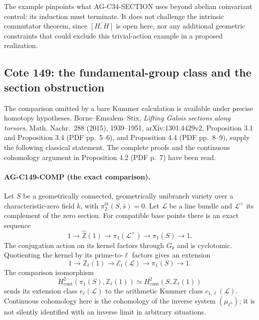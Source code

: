 The example pinpoints what AG-C34-SECTION uses beyond abelian
coinvariant control: its induction must terminate. It does not challenge
the intrinsic commutator theorem, since $\overline{[H,H]}$ is open
here, nor any additional geometric constraints that could exclude this
trivial-action example in a proposed realization.

\subsection{Cote 149: the fundamental-group class and the section obstruction}
\label{ag:c149-comparison}

The comparison omitted by a bare Kummer calculation is available under
precise homotopy hypotheses. Borne--Emsalem--Stix,
\emph{Lifting Galois sections along torsors}, Math. Nachr.~288 (2015),
1939--1951, arXiv:1301.4429v2, Proposition 3.1 and Proposition 3.4
(PDF pp.~5--6), and Proposition 4.4 (PDF pp.~8--9), supply the
following classical statement. The complete proofs and the continuous
cohomology argument in Proposition 4.2 (PDF p.~7) have been read.

\paragraph{AG-C149-COMP (the exact comparison).}
Let $S$ be a geometrically connected, geometrically unibranch variety
over a characteristic-zero field $k$, with
$\pi^{\text{ét}}_2(S,\bar s)=0$. Let $\mathcal L$ be a line
bundle and $\mathcal L^\times$ its complement of the zero section.
For compatible base points there is an exact sequence
\[
 1\longrightarrow\widehat{\mathbb Z}(1)
 \longrightarrow\pi_1(\mathcal L^\times)
 \longrightarrow\pi_1(S)\longrightarrow1.
\]
The conjugation action on its kernel factors through $G_k$ and is
cyclotomic. Quotienting the kernel by its prime-to-$\ell$ factors gives
an extension
\begin{equation}\label{eq:ag-c149-extension}
 1\longrightarrow\mathbb Z_\ell(1)
 \longrightarrow\mathcal E_\ell(\mathcal L)
 \longrightarrow\pi_1(S)\longrightarrow1.
\end{equation}
The comparison isomorphism
\[
 H^2_{\mathrm{cont}}(\pi_1(S),\mathbb Z_\ell(1))
 \simeq H^2_{\mathrm{cont}}(S,\mathbb Z_\ell(1))
\]
sends its extension class $e_\ell(\mathcal L)$ to the arithmetic
Kummer class $c_{1,\ell}(\mathcal L)$. Continuous cohomology here is
the cohomology of the inverse system $(\mu_{\ell^n})$; it is not
silently identified with an inverse limit in arbitrary situations.

